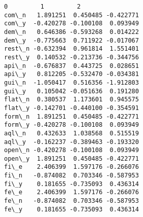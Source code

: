 \documentclass[11pt]{article}
\makeatletter
\newcommand{\boxspacing}{\kern\kvtcb@left@rule\kern\kvtcb@boxsep}
\newcommand{\prompt}[4]{
        \ttfamily\llap{{\color{#2}[#3]:\hspace{3pt}#4}}\vspace{-\baselineskip}
    }
\makeatother
\begin{document}
            \begin{tcolorbox}[breakable, size=fbox, boxrule=.5pt, pad at break*=1mm, opacityfill=0]
\prompt{Out}{outcolor}{581}{\boxspacing}
\begin{Verbatim}[commandchars=\\\{\}]
               0         1         2
com\_n   1.891251  0.450485 -0.422771
com\_y  -0.420278 -0.100108  0.093949
dem\_n   0.646386 -0.593268  0.014222
dem\_y  -0.775663  0.711922 -0.017067
rest\_n -0.632394  0.961814  1.551401
rest\_y  0.140532 -0.213736 -0.344756
api\_n  -0.676837  0.443725  0.028651
api\_y   0.812205 -0.532470 -0.034381
gui\_n  -1.050417  0.516356 -1.912803
gui\_y   0.105042 -0.051636  0.191280
flat\_n  0.380537  1.173601  0.945575
flat\_y -0.142701 -0.440100 -0.354591
form\_n  1.891251  0.450485 -0.422771
form\_y -0.420278 -0.100108  0.093949
aql\_n   0.432633  1.038568  0.515519
aql\_y  -0.162237 -0.389463 -0.193320
open\_n -0.420278 -0.100108  0.093949
open\_y  1.891251  0.450485 -0.422771
fi\_e    2.406399  1.597176 -0.266076
fi\_n   -0.874082  0.703346 -0.587953
fi\_y    0.181655 -0.735093  0.436314
fe\_e    2.406399  1.597176 -0.266076
fe\_n   -0.874082  0.703346 -0.587953
fe\_y    0.181655 -0.735093  0.436314
\end{Verbatim}
\end{tcolorbox}
        
\end{document}
